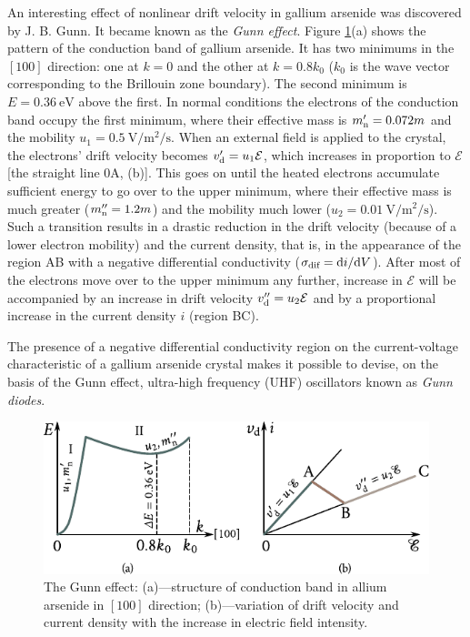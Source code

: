 An interesting effect of nonlinear drift velocity in gallium arsenide was discovered by J. B. Gunn. It became known as the \textit{Gunn effect}. Figure \ref{fig:6_17}(a) shows the pattern of the conduction band of gallium arsenide. It has two minimums in the $[100]$ direction: one at $k=0$ and the other at $k=0.8k_0$ ($k_0$ is the wave vector corresponding to the Brillouin zone boundary). The second minimum is $E=\SI{0.36}{\electronvolt}$ above the first. In normal conditions the electrons of the conduction band occupy the first minimum, where their effective mass is $m_{\text{n}}'=0.072m$ and the mobility $u_1=\SI{0.5}{\volt\per\metre\squared\per\second}$.
When an external field is applied to the crystal, the electrons' drift velocity becomes $v_{\text{d}}'=u_1\mathcal{E}$, which increases in proportion to $\mathcal{E}$ [the straight line $0$A,
(b)]. This goes on until the heated electrons accumulate sufficient energy to go over to the upper minimum, where their effective mass is much greater ($m_{\text{n}}''=1.2m$) and the mobility much lower ($u_2=\SI{0.01}{\volt\per\metre\squared\per\second}$). Such a transition results in a drastic reduction in the drift velocity (because of a lower electron mobility) and the current density, that is, in the appearance of the region AB with a negative differential conductivity ($\sigma_{\text{dif}}=\mathrm{d} i/\mathrm{d} V$). After most of the
electrons move over to the upper minimum any further, increase in $\mathcal{E}$ will be accompanied by an increase in drift velocity $v_{\text{d}}''=u_2\mathcal{E}$ and by a proportional increase in the current density $i$ (region BC).

The presence of a negative differential conductivity region on the current-voltage characteristic of a gallium arsenide crystal makes it possible to devise, on the basis of the Gunn effect, ultra-high frequency (UHF) oscillators known as \textit{Gunn diodes}.

\begin{figure}[t]
	\begin{center}
		\includegraphics[scale=1]{figures/ch_06/fig_6_17.pdf}
		\caption[]{The Gunn effect: (a)---structure of conduction band in allium arsenide in $[100]$ direction; (b)---variation of drift velocity and current density with the increase in electric field intensity.}
		\label{fig:6_17}
	\end{center}
	\vspace{-0.7cm}
\end{figure}

